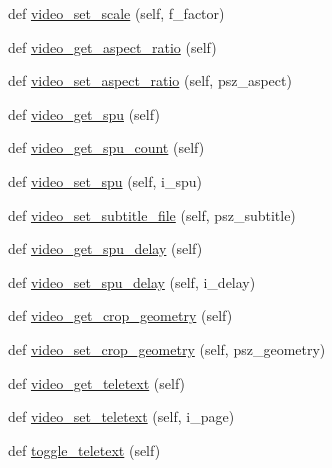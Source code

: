 \begin{DoxyCompactItemize}
\item 
def \hyperlink{classsrc_1_1lib_1_1vlc_1_1MediaPlayer_afafb19fd462455d788947ec40aeeef10}{video\+\_\+set\+\_\+scale} (self, f\+\_\+factor)
\item 
def \hyperlink{classsrc_1_1lib_1_1vlc_1_1MediaPlayer_a868650ac1b1689203a719feed6a4991f}{video\+\_\+get\+\_\+aspect\+\_\+ratio} (self)
\item 
def \hyperlink{classsrc_1_1lib_1_1vlc_1_1MediaPlayer_a3a3f7c0027462e1a6a90194e7db7b64f}{video\+\_\+set\+\_\+aspect\+\_\+ratio} (self, psz\+\_\+aspect)
\item 
def \hyperlink{classsrc_1_1lib_1_1vlc_1_1MediaPlayer_ac82c36a85641dbea77ed9e559ce6764d}{video\+\_\+get\+\_\+spu} (self)
\item 
def \hyperlink{classsrc_1_1lib_1_1vlc_1_1MediaPlayer_a7b336a60a47b2082c5afc97186f16906}{video\+\_\+get\+\_\+spu\+\_\+count} (self)
\item 
def \hyperlink{classsrc_1_1lib_1_1vlc_1_1MediaPlayer_a82ce3c2793cdae6bcd58b791207ccbbf}{video\+\_\+set\+\_\+spu} (self, i\+\_\+spu)
\item 
def \hyperlink{classsrc_1_1lib_1_1vlc_1_1MediaPlayer_ae1be3b035c656eb58936d74cc9d3dfe8}{video\+\_\+set\+\_\+subtitle\+\_\+file} (self, psz\+\_\+subtitle)
\item 
def \hyperlink{classsrc_1_1lib_1_1vlc_1_1MediaPlayer_ae2ffc7b35c6549135065fd8539db2aa2}{video\+\_\+get\+\_\+spu\+\_\+delay} (self)
\item 
def \hyperlink{classsrc_1_1lib_1_1vlc_1_1MediaPlayer_a6e20b6646c6ea64075ba8214fe81d535}{video\+\_\+set\+\_\+spu\+\_\+delay} (self, i\+\_\+delay)
\item 
def \hyperlink{classsrc_1_1lib_1_1vlc_1_1MediaPlayer_a7e2568d37070db60ea97b9693bd39d58}{video\+\_\+get\+\_\+crop\+\_\+geometry} (self)
\item 
def \hyperlink{classsrc_1_1lib_1_1vlc_1_1MediaPlayer_a057bc45fd74d1b95f11df38d30b9056d}{video\+\_\+set\+\_\+crop\+\_\+geometry} (self, psz\+\_\+geometry)
\item 
def \hyperlink{classsrc_1_1lib_1_1vlc_1_1MediaPlayer_ab410b9c17a0391c851ee01089c47e0a5}{video\+\_\+get\+\_\+teletext} (self)
\item 
def \hyperlink{classsrc_1_1lib_1_1vlc_1_1MediaPlayer_a0efc8057b519318771ba93b1b5885f98}{video\+\_\+set\+\_\+teletext} (self, i\+\_\+page)
\item 
def \hyperlink{classsrc_1_1lib_1_1vlc_1_1MediaPlayer_a1b606170fc420117911d3490098407b4}{toggle\+\_\+teletext} (self)
\item 

\end{DoxyCompactItemize}
